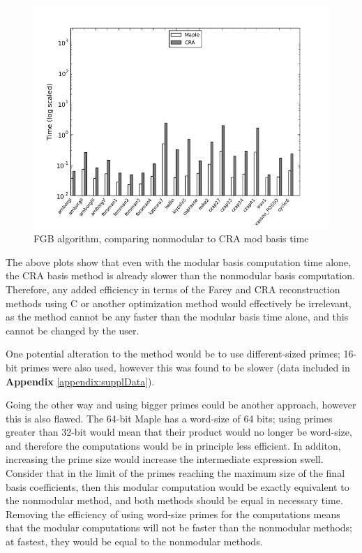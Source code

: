 \documentclass[letterpaper,12pt,titlepage,oneside,final]{book}
\begin{document}
\begin{figure}[H]
  \centering
  \includegraphics[scale=0.7]{fgb_mapleVsCRA_modBasisTime.png}
  \caption{FGB algorithm, comparing nonmodular to CRA mod basis time \label{fig:f4_tests}}
\end{figure}  

The above plots show that even with the modular basis computation time alone, the CRA basis method is already slower than the nonmodular basis computation.  Therefore, any added efficiency in terms of the Farey and CRA reconstruction methods using C or another optimization method would effectively be irrelevant, as the method cannot be any faster than the modular basis time alone, and this cannot be changed by the user.  

One potential alteration to the method would be to use different-sized primes; 16-bit primes were also used, however this was found to be slower (data included in \textbf{Appendix} \ref{appendix:supplData}).  

Going the other way and using bigger primes could be another approach, however this is also flawed.  The 64-bit Maple has a word-size of 64 bits; using primes greater than 32-bit would mean that their product would no longer be word-size, and therefore the computations would be in principle less efficient.  In additon, increasing the prime size would increase the intermediate expression swell.  Consider that in the limit of the primes reaching the maximum size of the final basis coefficients, then this modular computation would be exactly equivalent to the nonmodular method, and both methods should be equal in necessary time.  Removing the efficiency of using word-size primes for the computations means that the modular computations will not be faster than the nonmodular methods; at fastest, they would be equal to the nonmodular methods.  
\end{document}
